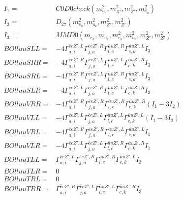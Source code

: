 \documentclass[A4,landscape]{article}
\begin{document}
\begin{align} 
I_1 = & C0D0check(m^2_{u_{{c}}}, m^2_{{Z'}}, m^2_{{Z'}}, m^2_{e_{{a}}}) \\ 
I_2 = & D_{27}(m^2_{e_{{a}}}, m^2_{u_{{c}}}, m^2_{{Z'}}, m^2_{{Z'}}) \\ 
I_3 = & MMD0(m_{e_{{a}}}, m_{u_{{c}}}, m^2_{e_{{a}}}, m^2_{u_{{c}}}, m^2_{{Z'}}, m^2_{{Z'}}) \\ 
  BOlluuSLL= & -4  \Gamma^{\bar{e}e {Z'} ,L}_{a, i} \Gamma^{\bar{e}e {Z'} ,R}_{j, a} \Gamma^{\bar{u}u {Z'} ,R}_{l, c} \Gamma^{\bar{u}u {Z'} ,L}_{c, k} I_3 \\ 
  BOlluuSRR= & -4  \Gamma^{\bar{e}e {Z'} ,R}_{a, i} \Gamma^{\bar{e}e {Z'} ,L}_{j, a} \Gamma^{\bar{u}u {Z'} ,L}_{l, c} \Gamma^{\bar{u}u {Z'} ,R}_{c, k} I_3 \\ 
  BOlluuSRL= & -4  \Gamma^{\bar{e}e {Z'} ,R}_{a, i} \Gamma^{\bar{e}e {Z'} ,L}_{j, a} \Gamma^{\bar{u}u {Z'} ,R}_{l, c} \Gamma^{\bar{u}u {Z'} ,L}_{c, k} I_3 \\ 
  BOlluuSLR= & -4  \Gamma^{\bar{e}e {Z'} ,L}_{a, i} \Gamma^{\bar{e}e {Z'} ,R}_{j, a} \Gamma^{\bar{u}u {Z'} ,L}_{l, c} \Gamma^{\bar{u}u {Z'} ,R}_{c, k} I_3 \\ 
  BOlluuVRR= & -4  \Gamma^{\bar{e}e {Z'} ,R}_{a, i} \Gamma^{\bar{e}e {Z'} ,R}_{j, a} \Gamma^{\bar{u}u {Z'} ,R}_{l, c} \Gamma^{\bar{u}u {Z'} ,R}_{c, k} (I_1 - 3 I_2) \\ 
  BOlluuVLL= & -4  \Gamma^{\bar{e}e {Z'} ,L}_{a, i} \Gamma^{\bar{e}e {Z'} ,L}_{j, a} \Gamma^{\bar{u}u {Z'} ,L}_{l, c} \Gamma^{\bar{u}u {Z'} ,L}_{c, k} (I_1 - 3 I_2) \\ 
  BOlluuVRL= & -4  \Gamma^{\bar{e}e {Z'} ,R}_{a, i} \Gamma^{\bar{e}e {Z'} ,R}_{j, a} \Gamma^{\bar{u}u {Z'} ,L}_{l, c} \Gamma^{\bar{u}u {Z'} ,L}_{c, k} I_1 \\ 
  BOlluuVLR= & -4  \Gamma^{\bar{e}e {Z'} ,L}_{a, i} \Gamma^{\bar{e}e {Z'} ,L}_{j, a} \Gamma^{\bar{u}u {Z'} ,R}_{l, c} \Gamma^{\bar{u}u {Z'} ,R}_{c, k} I_1 \\ 
  BOlluuTLL= &  \Gamma^{\bar{e}e {Z'} ,L}_{a, i} \Gamma^{\bar{e}e {Z'} ,R}_{j, a} \Gamma^{\bar{u}u {Z'} ,R}_{l, c} \Gamma^{\bar{u}u {Z'} ,L}_{c, k} I_3 \\ 
  BOlluuTLR= & 0 \\ 
  BOlluuTRL= & 0 \\ 
  BOlluuTRR= &  \Gamma^{\bar{e}e {Z'} ,R}_{a, i} \Gamma^{\bar{e}e {Z'} ,L}_{j, a} \Gamma^{\bar{u}u {Z'} ,L}_{l, c} \Gamma^{\bar{u}u {Z'} ,R}_{c, k} I_3 \\ 
\end{align} 
\end{document}
